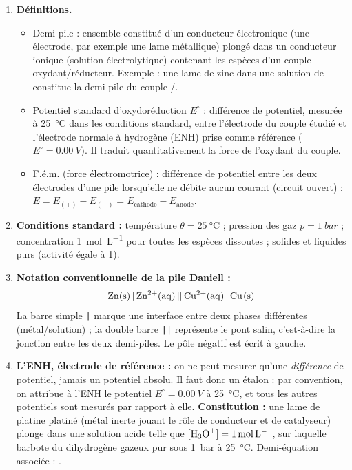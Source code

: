 \documentclass[11pt]{article}
\newcommand{\cle}[1]{{\popxbold\color{popdark}#1}}
\begin{document}
\begin{corrige}
\begin{enumerate}
\item \textbf{Définitions.}
\begin{itemize}
\item \cle{Demi-pile} : ensemble constitué d'un conducteur électronique (une électrode, par exemple une lame métallique) plongé dans un conducteur ionique (solution électrolytique) contenant les espèces d'un couple oxydant/réducteur. Exemple : une lame de zinc dans une solution de  constitue la demi-pile du couple /.
\item \cle{Potentiel standard d'oxydoréduction} $E^{\circ}$ : différence de potentiel, mesurée à \SI{25}{\celsius} dans les conditions standard, entre l'électrode du couple étudié et l'électrode normale à hydrogène (ENH) prise comme référence ($E^{\circ} = \SI{0,00}{V}$). Il traduit quantitativement la force de l'oxydant du couple.
\item \cle{F.é.m.} (force électromotrice) : différence de potentiel entre les deux électrodes d'une pile lorsqu'elle ne débite aucun courant (circuit ouvert) : $E = E_{(+)} - E_{(-)} = E_{\text{cathode}} - E_{\text{anode}}$.
\end{itemize}
\item \textbf{Conditions standard :} température $\theta = \SI{25}{\celsius}$ ; pression des gaz $p = \SI{1}{bar}$ ; concentration \SI{1}{mol.L^{-1}} pour toutes les espèces dissoutes ; solides et liquides purs (activité égale à 1).
\item \textbf{Notation conventionnelle de la pile Daniell :}
\[ \ce{Zn(s) | Zn^2+(aq) || Cu^2+(aq) | Cu(s)} \]
La barre simple \texttt{|} marque une interface entre deux phases différentes (métal/solution) ; la double barre \texttt{||} représente le pont salin, c'est-à-dire la jonction entre les deux demi-piles. Le pôle négatif est écrit à gauche.
\item \textbf{L'ENH, électrode de référence :} on ne peut mesurer qu'une \emph{différence} de potentiel, jamais un potentiel absolu. Il faut donc un étalon : par convention, on attribue à l'ENH le potentiel $E^{\circ} = \SI{0,00}{V}$ à \SI{25}{\celsius}, et tous les autres potentiels sont mesurés par rapport à elle. \textbf{Constitution :} une lame de platine platiné (métal inerte jouant le rôle de conducteur et de catalyseur) plonge dans une solution acide telle que $[\ce{H3O+}] = \SI{1}{mol.L^{-1}}$, sur laquelle barbote du dihydrogène gazeux pur sous \SI{1}{bar} à \SI{25}{\celsius}. Demi-équation associée : .
\end{enumerate}
\end{corrige}
\end{document}
